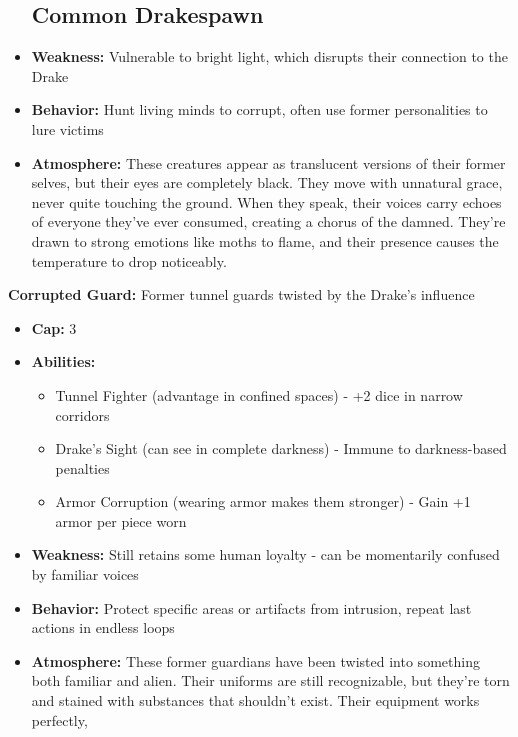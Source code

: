 \documentclass[11pt]{article}
\begin{document}
\begin{itemize}
\subsection{Common Drakespawn}  \item \textbf{Weakness:} Vulnerable to bright light, which disrupts their connection to the Drake \item \textbf{Behavior:} Hunt living minds to corrupt, often use former personalities to lure victims \item \textbf{Atmosphere:} These creatures appear as translucent versions of their former selves, but their eyes are completely black. They move with unnatural grace, never quite touching the ground. When they speak, their voices carry echoes of everyone they've ever consumed, creating a chorus of the damned. They're drawn to strong emotions like moths to flame, and their presence causes the temperature to drop noticeably. \end{itemize} \item \textbf{Corrupted Guard:} Former tunnel guards twisted by the Drake's influence \begin{itemize} \item \textbf{Cap:} 3 \item \textbf{Abilities:} \begin{itemize} \item Tunnel Fighter (advantage in confined spaces) - +2 dice in narrow corridors \item Drake's Sight (can see in complete darkness) - Immune to darkness-based penalties \item Armor Corruption (wearing armor makes them stronger) - Gain +1 armor per piece worn \end{itemize} \item \textbf{Weakness:} Still retains some human loyalty - can be momentarily confused by familiar voices \item \textbf{Behavior:} Protect specific areas or artifacts from intrusion, repeat last actions in endless loops \item \textbf{Atmosphere:} These former guardians have been twisted into something both familiar and alien. Their uniforms are still recognizable, but they're torn and stained with substances that shouldn't exist. Their equipment works perfectly, 
\end{itemize}
\end{document}
